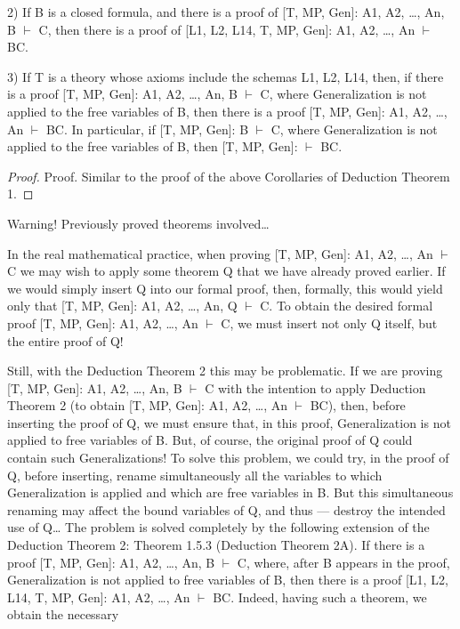 \begin{corollary}

2) If B is a closed formula, and there is a proof of [T, MP, Gen]: A1, A2, \ldots , An, B \(\vdash\) C, then there is a
proof of [L1, L2, L14, T, MP, Gen]: A1, A2, \ldots , An \(\vdash\) B\IMPLIES C.
\end{corollary}

\begin{corollary}
3) If T is a theory whose axioms include the schemas L1, L2, L14, then, if there is a proof [T, MP, Gen]:
A1, A2, \ldots , An, B \(\vdash\) C, where Generalization is not applied to the free variables of B, then there is a proof
[T, MP, Gen]: A1, A2, \ldots , An \(\vdash\) B\IMPLIES C. In particular, if [T, MP, Gen]: B \(\vdash\) C, where Generalization is not
applied to the free variables of B, then [T, MP, Gen]: \(\vdash\) B\IMPLIES C.
\end{corollary}

\begin{proof}
Proof. Similar to the proof of the above Corollaries of Deduction Theorem 1.
\end{proof}

Warning! Previously proved theorems involved\ldots 

In the real mathematical practice, when proving [T, MP, Gen]: A1, A2, \ldots , An \(\vdash\) C we may wish to apply some theorem Q that we have already proved earlier. If we would simply insert Q into our formal proof, then, formally, this would yield only that [T, MP, Gen]: A1, A2, \ldots , An, Q \(\vdash\) C. To obtain the desired formal proof [T, MP, Gen]: A1, A2, \ldots , An \(\vdash\) C, we must insert not only Q itself, but the entire proof of Q!

Still, with the Deduction Theorem 2 this may be problematic. If we are proving [T, MP, Gen]: A1, A2, \ldots ,
An, B \(\vdash\) C with the intention to apply Deduction Theorem 2 (to obtain [T, MP, Gen]: A1, A2, \ldots , An \(\vdash\)
B\IMPLIES C), then, before inserting the proof of Q, we must ensure that, in this proof, Generalization is not
applied to free variables of B. But, of course, the original proof of Q could contain such Generalizations!
To solve this problem, we could try, in the proof of Q, before inserting, rename simultaneously all the
variables to which Generalization is applied and which are free variables in B. But this simultaneous
renaming may affect the bound variables of Q, and thus --- destroy the intended use of Q\ldots 
The problem is solved completely by the following extension of the Deduction Theorem 2:
Theorem 1.5.3 (Deduction Theorem 2A). If there is a proof [T, MP, Gen]: A1, A2, \ldots , An, B \(\vdash\) C, where,
after B appears in the proof, Generalization is not applied to free variables of B, then there is a proof
[L1, L2, L14, T, MP, Gen]: A1, A2, \ldots , An \(\vdash\) B\IMPLIES C.
Indeed, having such a theorem, we obtain the necessary

